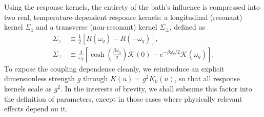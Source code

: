 Using the response kernels, the entirety of the bath's influence is compressed into two real, temperature-dependent response kernels: a longitudinal (resonant) kernel $\Sigma_z$ and a transverse (non-resonant) kernel $\Sigma_{\perp}$, defined as
\begin{equation}
    \begin{split}
    \Sigma_z & \equiv \frac{1}{2} \left[R(\omega_q) - R(-\omega_q)\right], \\
    \Sigma_\perp &\equiv \frac{4}{\omega_q} \left[ \cosh\left(\frac{\beta\omega_q}{2}\right) \mathcal{K}(0) - e^{-\beta\omega_q/2} \mathcal{K}(\omega_q) \right].
    \end{split}
    \label{eq:bath_kernels_direct}
\end{equation}
To expose the coupling dependence cleanly, we reintroduce an explicit
dimensionless strength $g$ through $K(u) = g^2 K_0(u)$, so that all response
kernels scale as $g^2$. In the interests of brevity, we shall subsume this factor into the definition of parameters, except in those cases where physically relevant effects depend on it. 

